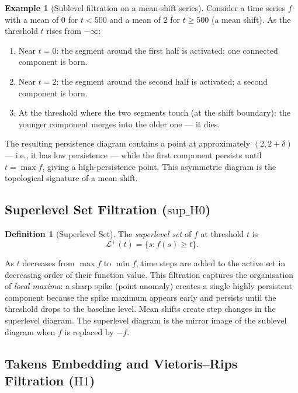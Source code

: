 \documentclass[12pt, a4paper]{article}
\theoremstyle{definition}
\newtheorem{definition}{Definition}[section]
\newtheorem{example}{Example}[section]
\theoremstyle{plain}
\begin{document}
\begin{example}[Sublevel filtration on a mean-shift series]
Consider a time series $f$ with a mean of $0$ for $t < 500$ and a mean of $2$
for $t \geq 500$ (a mean shift). As the threshold $t$ rises from $-\infty$:
\begin{enumerate}[nosep, label=\roman*.]
  \item Near $t = 0$: the segment around the first half is activated; one
    connected component is born.
  \item Near $t = 2$: the segment around the second half is activated; a second
    component is born.
  \item At the threshold where the two segments touch (at the shift boundary):
    the younger component merges into the older one — it dies.
\end{enumerate}
The resulting persistence diagram contains a point at approximately $(2, 2+\delta)$
— i.e., it has low persistence — while the first component persists until
$t = \max f$, giving a high-persistence point. This asymmetric diagram is the
topological signature of a mean shift.
\end{example}

\subsection{Superlevel Set Filtration ($\text{sup\_H0}$)}

\begin{definition}[Superlevel Set]
The \emph{superlevel set} of $f$ at threshold $t$ is
\[
  \mathcal{L}^+(t) = \{s : f(s) \geq t\}.
\]
\end{definition}

As $t$ decreases from $\max f$ to $\min f$, time steps are added to the active
set in decreasing order of their function value. This filtration captures the
organisation of \emph{local maxima}: a sharp spike (point anomaly) creates a
single highly persistent component because the spike maximum appears early and
persists until the threshold drops to the baseline level. Mean shifts create step
changes in the superlevel diagram. The superlevel diagram is the mirror image of
the sublevel diagram when $f$ is replaced by $-f$.

\subsection{Takens Embedding and Vietoris--Rips Filtration ($\text{H1}$)}
\end{document}
